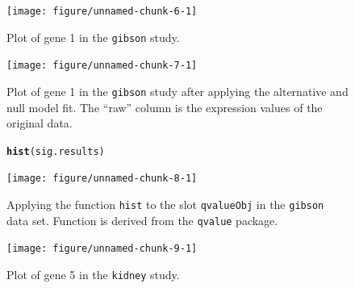 \documentclass{article}\usepackage[]{graphicx}\usepackage[]{color}
\makeatletter
\newcommand{\hlstd}[1]{\textcolor[rgb]{0.345,0.345,0.345}{#1}}%
\newcommand{\hlkwd}[1]{\textcolor[rgb]{0.737,0.353,0.396}{\textbf{#1}}}%
\newenvironment{kframe}{%
 \def\at@end@of@kframe{}%
 \ifinner\ifhmode%
  \def\at@end@of@kframe{\end{minipage}}%
  \begin{minipage}{\columnwidth}%
 \fi\fi%
 \def\FrameCommand##1{\hskip\@totalleftmargin \hskip-\fboxsep
 \colorbox{shadecolor}{##1}\hskip-\fboxsep
     \hskip-\linewidth \hskip-\@totalleftmargin \hskip\columnwidth}%
 \MakeFramed {\advance\hsize-\width
   \@totalleftmargin\z@ \linewidth\hsize
   \@setminipage}}%
 {\par\unskip\endMakeFramed%
 \at@end@of@kframe}
\newenvironment{knitrout}{}{} %
\makeatother
\begin{document}
\begin{figure}[!htbp]
 \centering
\begin{knitrout}
\color{fgcolor}

{\centering \texttt{[image: figure/unnamed-chunk-6-1]} 

}



\end{knitrout}
\caption{Plot of gene 1 in the {\tt gibson} study.}
\label{fig:gplot}
\end{figure}

\begin{figure}[!htbp]
 \centering
\begin{knitrout}
\color{fgcolor}

{\centering \texttt{[image: figure/unnamed-chunk-7-1]} 

}



\end{knitrout}
\caption{Plot of gene 1 in the {\tt gibson} study after applying the alternative and null model fit. The ``raw'' column is the expression values of the original data.}
\label{fig:gplotFit}
\end{figure}

\begin{figure}[!htbp]
 \centering
\begin{knitrout}
\color{fgcolor}\begin{kframe}
\begin{alltt}
\hlkwd{hist}\hlstd{(sig.results)}
\end{alltt}
\end{kframe}

{\centering \texttt{[image: figure/unnamed-chunk-8-1]} 

}



\end{knitrout}
\caption{Applying the function {\tt hist} to the slot {\tt qvalueObj} in the {\tt gibson} data set. Function is derived from the {\tt qvalue} package.}
\label{fig:gqvalHist}
\end{figure}



\begin{figure}[!htbp]
 \centering
\begin{knitrout}
\color{fgcolor}

{\centering \texttt{[image: figure/unnamed-chunk-9-1]} 

}



\end{knitrout}
\caption{Plot of gene 5 in the {\tt kidney} study.}
\label{fig:kplot}
\end{figure}
\end{document}
